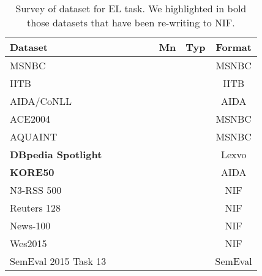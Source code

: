 \documentclass[sigconf]{acmart}
\newcommand{\cmark}{\ding{51}}%
\newcommand{\xmark}{\ding{55}}%
\begin{document}
\newcommand{\ccell}[1]{\multicolumn{1}{c}{#1}}
\newcommand{\rcell}[1]{\multicolumn{1}{r}{#1}}
\setlength{\tabcolsep}{1.2ex}
\begin{table}[tb!]
\centering
\caption{Survey of dataset for EL task. We highlighted in bold those datasets that have been re-writing to NIF.}
\label{tab:datasets} 
\begin{tabular}{lccc}
\toprule
\textbf{Dataset}~~~~~~~~~~~~~~~~~~ & \ccell{\textbf{Mn}} & \ccell{\textbf{Typ}}&\ccell{\textbf{Format}}\\\midrule
MSNBC~\cite{cucerzan2007large}      &\xmark &\xmark & MSNBC \\\midrule%
IITB~\cite{IITB2009}                &\cmark &\xmark & IITB  \\\midrule%
AIDA/CoNLL~\cite{aida2011}          &\cmark &\xmark & AIDA  \\\midrule%
ACE2004~\cite{aquaint}              &\xmark &\xmark & MSNBC \\\midrule%
AQUAINT~\cite{aquaint}              &\xmark &\xmark & MSNBC \\\midrule%
\textbf{DBpedia Spotlight}
\cite{mendes2011dbpedia}            &\cmark &\xmark & Lexvo \\\midrule%
\textbf{KORE50}~\cite{kore50}       &\cmark &\xmark & AIDA  \\\midrule%
N3-RSS 500~\cite{N3}                &\cmark &\xmark & NIF   \\\midrule%
Reuters 128~\cite{N3}               &\cmark &\xmark & NIF   \\\midrule%
News-100~\cite{N3}                  &\cmark &\xmark & NIF   \\\midrule%
Wes2015~\cite{wes2015}              &\cmark &\xmark & NIF   \\\midrule%
SemEval 2015 
Task 13~\cite{moro2015semeval}      &\cmark &\xmark & SemEval \\\midrule%

\end{tabular}
\end{table}
\end{document}
